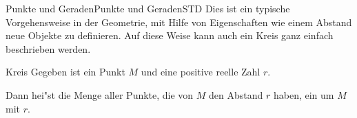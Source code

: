 \begin{MXContent}{Punkte und Geraden}{Punkte und Geraden}{STD}
Dies ist ein typische Vorgehensweise in der Geometrie, mit Hilfe von 
Eigenschaften wie einem Abstand neue Objekte zu definieren. Auf diese Weise
kann auch ein Kreis ganz einfach beschrieben werden.
\begin{MXInfo}{Kreis}
Gegeben ist ein Punkt $M$ und eine positive reelle Zahl $r$.
\par
\begin{minipage}[c]{6cm}
Dann hei"st die Menge aller Punkte, die von $M$ den Abstand $r$ haben, ein 
 um $M$ mit  $r$.
\end{minipage}
%
\begin{minipage}[c]{6cm}
\begin{center}
\end{center}
\end{minipage}
\end{MXInfo}
\end{MXContent}

